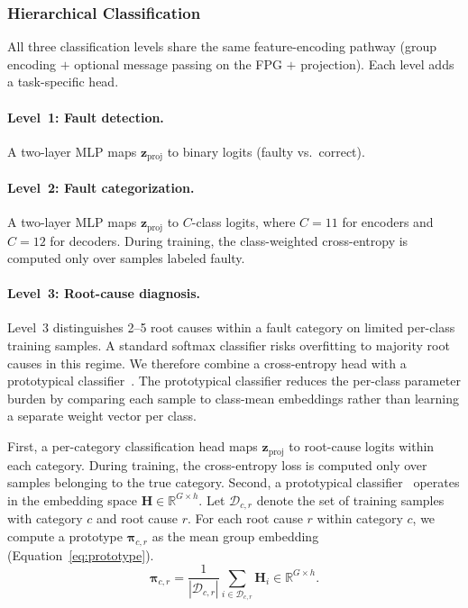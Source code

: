 \subsubsection{Hierarchical Classification}
\label{sec:defaultpp_stages}

All three classification levels share the same feature-encoding pathway (group encoding $+$ optional message passing on the FPG $+$ projection). Each level adds a task-specific head.

\paragraph{Level~1: Fault detection.}
A two-layer MLP maps $\mathbf{z}_{\text{proj}}$ to binary logits (faulty vs.\ correct).

\paragraph{Level~2: Fault categorization.}
A two-layer MLP maps $\mathbf{z}_{\text{proj}}$ to $C$-class logits, where $C = 11$ for encoders and $C = 12$ for decoders. During training, the class-weighted cross-entropy is computed only over samples labeled faulty.

\paragraph{Level~3: Root-cause diagnosis.}
Level~3 distinguishes 2--5 root causes within a fault category on limited per-class training samples. A standard softmax classifier risks overfitting to majority root causes in this regime. We therefore combine a cross-entropy head with a prototypical classifier~\cite{snell2017prototypical,kamp1995prototype}. The prototypical classifier reduces the per-class parameter burden by comparing each sample to class-mean embeddings rather than learning a separate weight vector per class.

First, a per-category classification head maps $\mathbf{z}_{\text{proj}}$ to root-cause logits within each category. During training, the cross-entropy loss is computed only over samples belonging to the true category. Second, a prototypical classifier~\cite{snell2017prototypical,lin2022prototypical} operates in the embedding space $\mathbf{H} \in \mathbb{R}^{G \times h}$. Let $\mathcal{D}_{c,r}$ denote the set of training samples with category $c$ and root cause $r$. For each root cause $r$ within category $c$, we compute a prototype $\symbf{\pi}_{c,r}$ as the mean group embedding (Equation~\ref{eq:prototype}).
\begin{equation}
\symbf{\pi}_{c,r} = \frac{1}{|\mathcal{D}_{c,r}|} \sum_{i \in \mathcal{D}_{c,r}} \mathbf{H}_i \in \mathbb{R}^{G \times h}.
\label{eq:prototype}
\end{equation}

